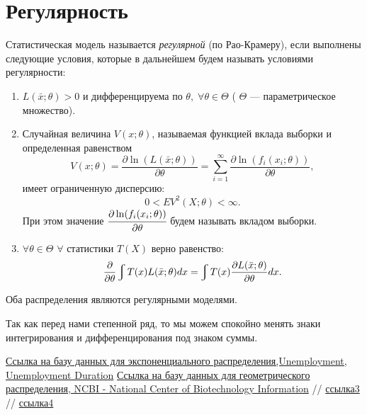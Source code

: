 \documentclass[a4paper,12pt, oneside]{book}
\let\int\varint
\begin{document}
\chapter{ Регулярность }

Статистическая модель называется \textit{регулярной} (по Рао-Крамеру), если выполнены следующие условия, которые в дальнейшем будем называть условиями регулярности:


\begin{enumerate}
	\item $L(\bar{x}; \theta) > 0$ и дифференцируема по $\theta, \; \forall \theta \in \Theta$ ( $\Theta$ --- параметрическое множество).
	\item Случайная величина $V(x; \theta)$, называемая функцией вклада выборки и определенная равенством
	\[V(x; \theta) = \frac{\partial \ln (L(\bar{x}; \theta))}{\partial \theta} = \sum \limits_{i = 1}^{\infty} \frac{\partial \ln(f_i(x_i;\theta))}{\partial \theta},\] имеет ограниченную дисперсию:
	\[0 < E V^2(X; \theta) < \infty. \] При этом значение $\cfrac{\partial \ln(f_i(x_i;\theta))}{\partial \theta}$  будем называть вкладом выборки.
	\item $\forall \theta \in \Theta$ $\forall$ статистики $T(X)$ верно равенство:
	\[
	\frac{\partial}{\partial \theta} \int T(x) L(\bar{x}; \theta) dx = \int T(x) \frac{\partial L(\bar{x}; \theta)}{\partial \theta} dx.
	\]
\end{enumerate}


Оба распределения являются регулярными моделями. 

Так как перед нами степенной ряд, то мы можем спокойно менять знаки интегрирования и дифференцирования под знаком суммы.

\begin{thebibliography}{99}
	 \href{https://vincentarelbundock.github.io/Rdatasets/datasets.html}{Ссылка на базу данных для экспоненциального распределения,Unemployment,  Unemployment Duration}
	  \href{https://www.ncbi.nlm.nih.gov/nuccore/NC_024460.2?report=fasta&from=10460803&to=10470316}{Ссылка на базу данных для геометрического распределения, NCBI - National Center of Biotechnology Information}
	  // \href{http://www.ams.jhu.edu/~dan/550.435/notes/COURSENOTES435.pdf}{ссылка3}
	  // \href{http://www.obzh.ru/nad/4-3.html}{ссылка4}
\end{thebibliography}
\end{document}
